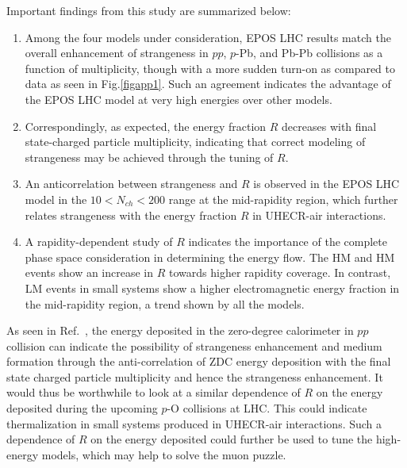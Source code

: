 \documentclass[aps,twocolumn,nofootinbib]{revtex4-1}
\begin{document}
Important findings from this study are summarized below:
 
 \begin{enumerate}
\item Among the four models under consideration, EPOS LHC results match the overall enhancement of strangeness in $pp$, $p$-Pb, and Pb-Pb collisions as a function of multiplicity, though with a more sudden turn-on as compared to data as seen in Fig.\ref{figapp1}. Such an agreement indicates the advantage of the EPOS LHC model at very high energies over other models.

\item Correspondingly, as expected, the energy fraction $R$ decreases with final state-charged particle multiplicity, indicating that correct modeling of strangeness may be achieved through the tuning of $R$.

\item An anticorrelation between strangeness and $R$ is observed in the EPOS LHC model in the $10<  N_{ch}< 200$ range at the mid-rapidity region, which further relates strangeness with the energy fraction $R$ in UHECR-air interactions. 

\item A rapidity-dependent study of $R$ indicates the importance of the complete phase space consideration in determining the energy flow. The HM and HM events show an increase in $R$ towards higher rapidity coverage. In contrast, LM events in small systems show a higher electromagnetic energy fraction in the mid-rapidity region, a trend shown by all the models.

\end{enumerate}

As seen in Ref.~\cite{Schotter:2023khz}, the energy deposited in the zero-degree calorimeter in $pp$ collision can indicate the possibility of strangeness enhancement and medium formation through the anti-correlation of ZDC energy
deposition with the final state charged particle multiplicity and hence the strangeness enhancement. It would thus be worthwhile to look at a similar dependence of $R$ on the energy deposited during the upcoming $p$-O collisions at LHC. This could indicate thermalization in small systems produced in UHECR-air interactions. Such a dependence of $R$ on the energy deposited could further be used to tune the high-energy models, which may help to solve the muon puzzle.
\end{document}
